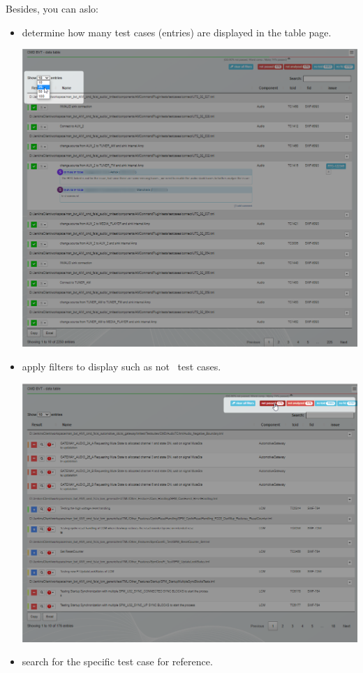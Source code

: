 Besides, you can aslo:
\begin{itemize}
   \item determine how many test cases (entries) are displayed in the table page.

         \includegraphics[width=0.9\linewidth]
         {./pictures/datatable/change_number_entries.png}
         
   \item apply filters to display such as not \passed\ test cases.
   
         \includegraphics[width=0.9\linewidth]
         {./pictures/datatable/apply_filter.png}

   \item search for the specific test case for reference.
   

\end{itemize}
